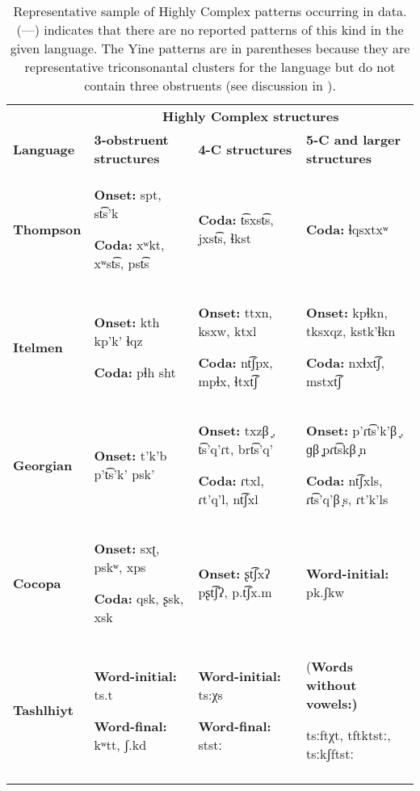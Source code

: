\begin{table}
\begin{tabularx}{\textwidth}{XXXX}
 & \multicolumn{3}{c}{ \textbf{Highly Complex structures}}\\
\lsptoprule
\textbf{Language} & \textbf{3-obstruent structures} & \textbf{4-C structures} & \textbf{5-C and larger structures}\\
\textbf{Thompson} & \textbf{Onset:} spt, st͡s’k

\textbf{Coda:} xʷkt, xʷst͡s, pst͡s & \textbf{Coda:} t͡sxst͡s, jxst͡s, ɬkst & \textbf{Coda:} ɬqsxtxʷ\\
\textbf{Itelmen} & \textbf{Onset:} kth kp'k' ɬqz

\textbf{Coda:} pɬh sht & \textbf{Onset:} ttxn, ksxw, ktxl

\textbf{Coda:} nt͡ʃpx, mpɬx, ɬtxt͡ʃ & \textbf{Onset:} kpɬkn, tksxqz, kstk’ɬkn

\textbf{Coda:} nxɬxt͡ʃ, mstxt͡ʃ\\
\textbf{Georgian} & \textbf{Onset:} t'k'b p't͡s'k' psk’ & \textbf{Onset:} txzβ ̞, t͡s’q’ɾt, brt͡s'q{}'

\textbf{Coda:} ɾtxl, ɾt'q'l, nt͡ʃxl & \textbf{Onset:} p’ɾt͡s’k’β ̞, ɡβ ̞pɾt͡skβ ̞n

\textbf{Coda:} nt͡ʃxls, ɾt͡s’q’β ̞s, ɾt'k'ls\\
\textbf{Cocopa} & \textbf{Onset:} sxʈ, pskʷ, xps

\textbf{Coda:} qsk, ʂsk, xsk & \textbf{Onset:} ʂt͡ʃxʔ pʂt͡ʃʔ, p.t͡ʃx.m & \textbf{Word-initial:} pk.ʃkw\\
\textbf{Tashlhiyt} & \textbf{Word-initial:} ts.t

\textbf{Word-final:} kʷtt, ʃ.kd & \textbf{Word-initial:} ts:χs

\textbf{Word-final:} ststː & (\textbf{Words without vowels:)}

tsːftχt, tftktstː, tsːkʃftstː\\
\lspbottomrule
\end{tabularx}
\caption{\label{tab:3.12cont} Representative sample of Highly Complex patterns occurring in data. (—) indicates that there are no reported patterns of this kind in the given language. The Yine patterns are in parentheses because they are representative triconsonantal clusters for the language but do not contain three obstruents (see discussion in ).}
\end{table}

